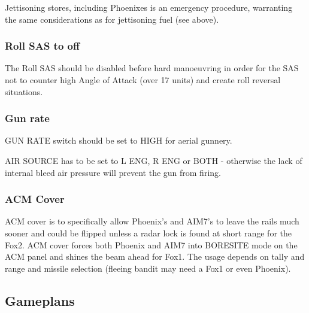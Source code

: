 Jettisoning stores, including Phoenixes is an emergency procedure, warranting
the same considerations as for jettisoning fuel (see above).

\subsubsection*{Roll SAS to off}

The Roll SAS should be disabled before hard manoeuvring in order for the SAS
not to counter high Angle of Attack (over 17 units) and create roll reversal
situations.

\subsubsection*{Gun rate}

GUN RATE switch should be set to HIGH for aerial gunnery.

AIR SOURCE has to be set to L ENG, R ENG or BOTH - otherwise the lack of
internal bleed air pressure will prevent the gun from firing.

\subsubsection*{ACM Cover}

ACM cover is to specifically allow Phoenix’s and AIM7’s to leave the rails much
sooner and could be flipped unless a radar lock is found at short range for the
Fox2. ACM cover forces both Phoenix and AIM7 into BORESITE mode on the ACM
panel and shines the beam ahead for Fox1. The usage depends on tally and range
and missile selection (fleeing bandit may need a Fox1 or even Phoenix).


\subsection{Gameplans}


